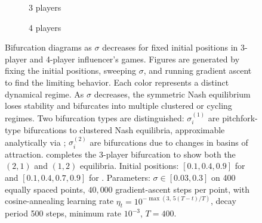 \documentclass{article}
\begin{document}
            \begin{figure}[ht!]
                \centering
                
                \begin{subfigure}[b]{0.9\linewidth}
                    \centering
                     
                    \caption{3 players} 
                    \label{fig:bifurc_local_games:b} 
                    \vspace{4ex}
                \end{subfigure} 


                \begin{subfigure}[b]{0.9\linewidth}
                    \centering
                     
                    \caption{4 players} 
                    \label{fig:bifurc_local_games:c}
                    \vspace{4ex}
                \end{subfigure}
                \caption{\small Bifurcation diagrams as $\sigma$ decreases for fixed initial positions in 3-player and 4-player influencer's games. Figures are generated by fixing the initial positions, sweeping $\sigma$, and running gradient ascent to find the limiting behavior. Each color represents a distinct dynamical regime. As $\sigma$ decreases, the symmetric Nash equilibrium loses stability and bifurcates into multiple clustered or cycling regimes. Two bifurcation types are distinguished: $\sigma_i^{(1)}$ are pitchfork-type bifurcations \cite{perko2001differential} to clustered Nash equilibria, approximable analytically via ; $\sigma_i^{(2)}$ are bifurcations due to changes in basins of attraction.  completes the 3-player bifurcation to show both the $(2,1)$ and $(1,2)$ equilibria. Initial positions: $[0.1,0.4,0.9]$ for  and $[0.1,0.4,0.7,0.9]$ for . Parameters: $\sigma\in[0.03,0.3]$ on 400 equally spaced points, $40{,}000$ gradient-ascent steps per point, with cosine-annealing learning rate $\eta_t = 10^{-\max(3,\,5(T-t)/T)}$, decay period 500 steps, minimum rate $10^{-3}$, $T=400$.}
                \label{fig:bifurc_local_games} 
            \end{figure}
            \clearpage
\end{document}
